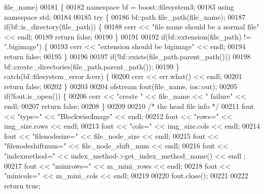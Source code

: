 \begin{DoxyCode}
      file\_name)
00181 \{
00182         \textcolor{keyword}{namespace }bf = boost::filesystem3;
00183         \textcolor{keyword}{using namespace }std;
00184 
00185         \textcolor{keywordflow}{try} \{
00186                 bf::path file\_path(file\_name);
00187                 \textcolor{keywordflow}{if}(bf::is\_directory(file\_path)) \{
00188                         cerr << \textcolor{stringliteral}{"file name should be a normal file"}  << endl;
00189                         \textcolor{keywordflow}{return} \textcolor{keyword}{false};
00190                 \}
00191 
00192                 \textcolor{keywordflow}{if}(bf::extension(file\_path) != \textcolor{stringliteral}{".bigimage"}) \{
00193                         cerr << \textcolor{stringliteral}{"extension should be bigimage"} << endl;
00194                         \textcolor{keywordflow}{return} \textcolor{keyword}{false};
00195                 \}
00196 
00197                 \textcolor{keywordflow}{if}(!bf::exists(file\_path.parent\_path()))
00198                         bf::create\_directories(file\_path.parent\_path());
00199         \} \textcolor{keywordflow}{catch}(bf::filesystem\_error &err) \{
00200                 cerr << err.what() << endl;
00201                 \textcolor{keywordflow}{return} \textcolor{keyword}{false};
00202         \}
00203 
00204         ofstream fout(file\_name, ios::out);
00205         \textcolor{keywordflow}{if}(!fout.is\_open()) \{
00206                 cerr << \textcolor{stringliteral}{"create "} << file\_name << \textcolor{stringliteral}{" failure"} << endl;
00207                 \textcolor{keywordflow}{return} \textcolor{keyword}{false};
00208         \}
00209 
00210         \textcolor{comment}{/* the head file info */}
00211         fout << \textcolor{stringliteral}{"type="} << \textcolor{stringliteral}{"BlockwiseImage"} << endl;
00212         fout << \textcolor{stringliteral}{"rows="} << img\_size.rows << endl;
00213         fout << \textcolor{stringliteral}{"cols="} << img\_size.cols << endl;
00214         fout << \textcolor{stringliteral}{"filenodesize="} << file\_node\_size << endl;
00215         fout << \textcolor{stringliteral}{"filenodeshiftnum="} << file\_node\_shift\_num << endl;
00216         fout << \textcolor{stringliteral}{"indexmethod="} << index\_method->get\_index\_method\_name() << endl
      ;
00217         fout << \textcolor{stringliteral}{"minirows="} << m\_mini\_rows << endl;
00218         fout << \textcolor{stringliteral}{"minicols="} << m\_mini\_cols << endl;
00219 
00220         fout.close();
00221 
00222         \textcolor{keywordflow}{return} \textcolor{keyword}{true};

\end{DoxyCode}
